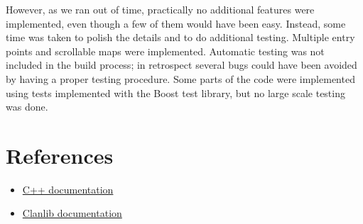 \documentclass[11pt]{article}
\begin{document}
However, as we ran out of time, practically no additional features
were implemented, even though a few of them would have been
easy. Instead, some time was taken to polish the details and to do
additional testing. Multiple entry points and scrollable maps were
implemented. Automatic testing was not included in the build process;
in retrospect several bugs could have been avoided by having a proper
testing procedure. Some parts of the code were implemented using tests
implemented with the Boost test library, but no large scale testing
was done.

\section{References}
\label{sec-7}

\begin{itemize}
\item \href{http://www.cplusplus.com}{C++ documentation}
\item \href{http://www.clanlib.org}{Clanlib documentation}
\end{itemize}
\end{document}
